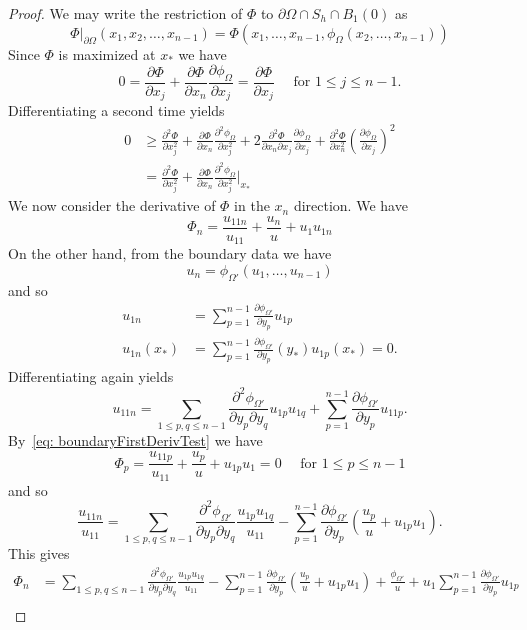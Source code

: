 \documentclass[10pt,a4paper]{amsart}
\newcommand{\del}{\partial}
\numberwithin{equation}{section}
\begin{document}
\begin{proof}
 We may write the restriction of  $\Phi$ to $\del\Omega \cap S_h \cap B_1(0)$ as
 \[
 \Phi\big|_{\del \Omega}(x_1,x_2,\ldots,x_{n-1}) = \Phi(x_1,\ldots,x_{n-1},\phi_\Omega(x_2,\ldots,x_{n-1}))
 \]
 Since $\Phi$ is maximized at $x_*$ we have
\begin{equation} \label{eq: boundaryFirstDerivTest}
 0=\frac{\del \Phi}{\del x_j} + \frac{\del \Phi}{\del x_n}\frac{\del \phi_{\Omega}}{\del x_j} = \frac{\del \Phi}{\del x_j} \quad \text{ for }1\leq j\leq n-1.
 \end{equation}
 Differentiating a second time yields
 \begin{equation}\label{eq: boundarySecondDerivTest}
 \begin{aligned}
0&\geq  \frac{\del^2 \Phi}{\del x_j^2} + \frac{\del \Phi}{\del x_n}\frac{\del^2 \phi_{\Omega}}{\del x_j^2} + 2\frac{\del^2 \Phi}{\del x_n\del x_{j}}\frac{\del \phi_{\Omega}}{\del x_j} + \frac{\del ^2\Phi}{\del x_n^2}\left(\frac{\del \phi_{\Omega}}{\del x_j}\right)^2\\
&= \frac{\del^2 \Phi}{\del x_j^2} + \frac{\del \Phi}{\del x_n}\frac{\del^2 \phi_{\Omega}}{\del x_j^2}\bigg|_{x_*}
\end{aligned}
 \end{equation}
We now consider the derivative of $\Phi$ in the $x_n$ direction.  We have
 \[
 \Phi_{n} = \frac{u_{11n}}{u_{11}}+\frac{u_n}{u} + u_1u_{1n}
 \]
 On the other hand, from the boundary data we have
 \[
 u_{n} = \phi_{\Omega'}(u_1,\ldots,u_{n-1})
 \]
 and so
 \[
 \begin{aligned}
 u_{1n} &= \sum_{p=1}^{n-1}\frac{\del \phi_{\Omega'}}{\del y_p}u_{1p} \\
  u_{1n}(x_*) &= \sum_{p=1}^{n-1}\frac{\del \phi_{\Omega'}}{\del y_p}(y_*)u_{1p}(x_*) = 0.
  \end{aligned}
 \]
 Differentiating again yields
 \[
 u_{11n} = \sum_{1 \leq p,q \leq n-1}\frac{\del^2 \phi_{\Omega'}}{\del y_p\del y_q}u_{1p}u_{1q} + \sum_{p=1}^{n-1}\frac{\del \phi_{\Omega'}}{\del y_p}u_{11p}.
 \]
By~\eqref{eq: boundaryFirstDerivTest} we have
\[
\Phi_p = \frac{u_{11p}}{u_{11}} + \frac{u_p}{u} + u_{1p}u_1=0 \quad \text{ for } 1 \leq p \leq n-1
\]
and so
\[
\frac{u_{11n}}{u_{11}} = \sum_{1 \leq p,q \leq n-1}\frac{\del^2 \phi_{\Omega'}}{\del y_p\del y_q}\frac{u_{1p}u_{1q}}{u_{11}} - \sum_{p=1}^{n-1}\frac{\del \phi_{\Omega'}}{\del y_p}\left(\frac{u_p}{u} + u_{1p}u_1\right).
\]
This gives
\[
\begin{aligned}
\Phi_n &= \sum_{1 \leq p,q \leq n-1}\frac{\del^2 \phi_{\Omega'}}{\del y_p\del y_q}\frac{u_{1p}u_{1q}}{u_{11}} - \sum_{p=1}^{n-1}\frac{\del \phi_{\Omega'}}{\del y_p}\left(\frac{u_p}{u} + u_{1p}u_1\right) + \frac{\phi_{\Omega'}}{u} + u_1 \sum_{p=1}^{n-1}\frac{\del \phi_{\Omega'}}{\del y_p}u_{1p}\\

\end{aligned}\]
\end{proof}
\end{document}
